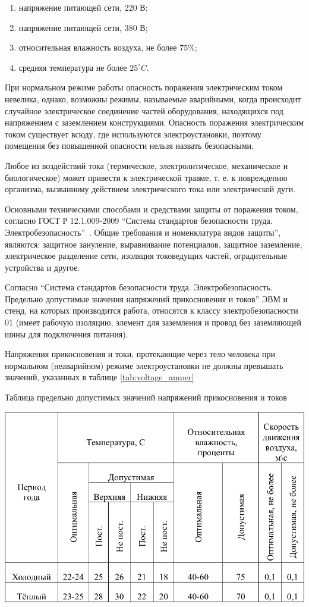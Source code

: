 \begin{enumerate}
\item напряжение питающей сети, 220 В;
\item напряжение питающей сети, 380 В;
\item относительная влажность воздуха, не более $75\%$;
\item средняя температура не более $25^{\circ}C$.
\end{enumerate}
При нормальном режиме работы опасность поражения электрическим током невелика, однако, возможны режимы, называемые аварийными, когда происходит случайное электрическое соединение частей оборудования, находящихся под напряжением с заземлением конструкциями. Опасность поражения электрическим током существует всюду, где используются электроустановки, поэтому помещения без повышенной опасности нельзя назвать безопасными.

Любое из воздействий тока (термическое, электролитическое, механическое и биологическое) может привести к электрической травме, т. е. к повреждению организма, вызванному действием электрического тока или электрической дуги.

Основными техническими способами и средствами защиты от поражения током, согласно ГОСТ Р 12.1.009-2009 ``Система стандартов безопасности труда. Электробезопасность''~\cite{OT11}. Общие требования и номенклатура видов защиты'', являются: защитное зануление, выравнивание потенциалов, защитное заземление, электрическое разделение сети, изоляция токоведущих частей, оградительные устройства и другое.

Согласно ``Система стандартов безопасности труда. Электробезопасность. Предельно допустимые значения напряжений прикосновения и токов'' ЭВМ и стенд, на которых производится работа, относятся к классу электробезопасности 01 (имеет рабочую изоляцию, элемент для заземления и провод без заземляющей шины для подключения питания).

Напряжения прикосновения и токи, протекающие через тело человека при нормальном (неаварийном) режиме электроустановки не должны превышать значений, указанных в таблице \ref{tab:voltage_amper}

\begin{table}[!ht]
\caption{Таблица предельно допустимых значений напряжений прикосновения и токов}
\centering
\includegraphics[page=2, width=1\linewidth]{secure_table.pdf}
\label{tab:voltage_amper}
\end{table}

